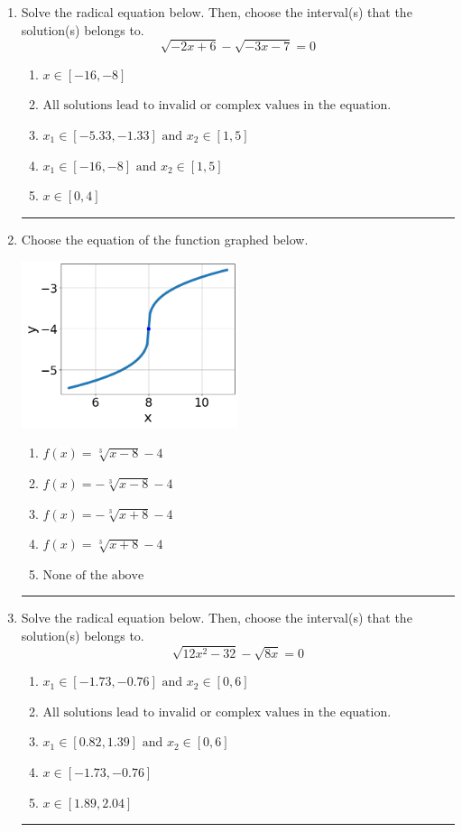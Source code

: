 \documentclass[14pt]{extbook}
\newcommand{\litem}[1]{\item#1\hspace*{-1cm}\rule{\textwidth}{0.4pt}}
\begin{document}
\begin{enumerate}
{\begin{enumerate}[label=\Alph*.]
\end{enumerate} }
\litem{
Solve the radical equation below. Then, choose the interval(s) that the solution(s) belongs to.\[ \sqrt{-2 x + 6} - \sqrt{-3 x - 7} = 0 \]\begin{enumerate}[label=\Alph*.]
\item \( x \in [-16,-8] \)
\item \( \text{All solutions lead to invalid or complex values in the equation.} \)
\item \( x_1 \in [-5.33, -1.33] \text{ and } x_2 \in [1,5] \)
\item \( x_1 \in [-16, -8] \text{ and } x_2 \in [1,5] \)
\item \( x \in [0,4] \)

\end{enumerate} }
\litem{
Choose the equation of the function graphed below.
\begin{center}
    \includegraphics[width=0.5\textwidth]{../Figures/radicalGraphToEquationCopyA.png}
\end{center}
\begin{enumerate}[label=\Alph*.]
\item \( f(x) = \sqrt[3]{x - 8} - 4 \)
\item \( f(x) = - \sqrt[3]{x - 8} - 4 \)
\item \( f(x) = - \sqrt[3]{x + 8} - 4 \)
\item \( f(x) = \sqrt[3]{x + 8} - 4 \)
\item \( \text{None of the above} \)

\end{enumerate} }
\litem{
Solve the radical equation below. Then, choose the interval(s) that the solution(s) belongs to.\[ \sqrt{12 x^2 - 32} - \sqrt{8 x} = 0 \]\begin{enumerate}[label=\Alph*.]
\item \( x_1 \in [-1.73, -0.76] \text{ and } x_2 \in [0,6] \)
\item \( \text{All solutions lead to invalid or complex values in the equation.} \)
\item \( x_1 \in [0.82, 1.39] \text{ and } x_2 \in [0,6] \)
\item \( x \in [-1.73,-0.76] \)
\item \( x \in [1.89,2.04] \)


\end{enumerate}}
\end{enumerate}
\end{document}
